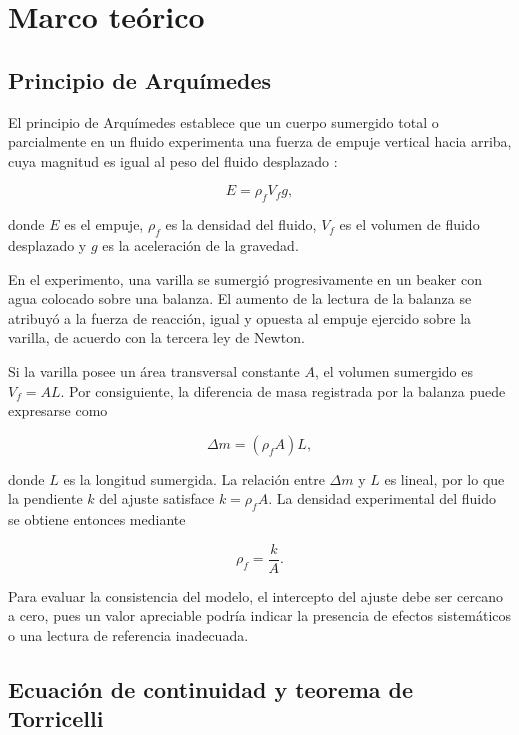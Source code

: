 \section{Marco teórico}

\subsection{Principio de Arquímedes}

El principio de Arquímedes establece que un cuerpo sumergido total o parcialmente en un fluido experimenta una fuerza de empuje vertical hacia arriba, cuya magnitud es igual al peso del fluido desplazado \cite{serway2018,young2018}:

\begin{equation}
    E = \rho_f V_f g,
    \label{eq:empuje}
\end{equation}

donde $E$ es el empuje, $\rho_f$ es la densidad del fluido, $V_f$ es el volumen de fluido desplazado y $g$ es la aceleración de la gravedad.

En el experimento, una varilla se sumergió progresivamente en un beaker con agua colocado sobre una balanza. El aumento de la lectura de la balanza se atribuyó a la fuerza de reacción, igual y opuesta al empuje ejercido sobre la varilla, de acuerdo con la tercera ley de Newton.

Si la varilla posee un área transversal constante $A$, el volumen sumergido es $V_f=AL$. Por consiguiente, la diferencia de masa registrada por la balanza puede expresarse como

\begin{equation}
    \Delta m = (\rho_f A)L,
    \label{eq:deltam}
\end{equation}

donde $L$ es la longitud sumergida. La relación entre $\Delta m$ y $L$ es lineal, por lo que la pendiente $k$ del ajuste satisface $k=\rho_f A$. La densidad experimental del fluido se obtiene entonces mediante

\begin{equation}
    \rho_f = \frac{k}{A}.
    \label{eq:densidad}
\end{equation}

Para evaluar la consistencia del modelo, el intercepto del ajuste debe ser cercano a cero, pues un valor apreciable podría indicar la presencia de efectos sistemáticos o una lectura de referencia inadecuada.

\subsection{Ecuación de continuidad y teorema de Torricelli}

